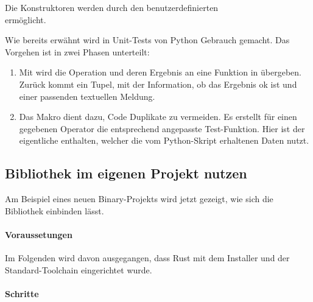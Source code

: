             Die  Konstruktoren werden durch den benutzerdefinierten \\  ermöglicht.

            Wie bereits erwähnt wird in Unit-Tests von Python Gebrauch gemacht. Das Vorgehen ist in zwei Phasen unterteilt:
            \begin{enumerate}
                \item Mit  wird die Operation und deren Ergebnis an eine Funktion in  übergeben. Zurück kommt ein Tupel, mit der Information, ob das Ergebnis ok ist und einer passenden textuellen Meldung.

                \item Das Makro  dient dazu, Code Duplikate zu vermeiden. Es erstellt für einen gegebenen Operator die entsprechend angepasste Test-Funktion. Hier ist der eigentliche  enthalten, welcher die vom Python-Skript erhaltenen Daten nutzt.
            \end{enumerate}


    \subsection{Bibliothek im eigenen Projekt nutzen} \label{sec:eigenesprojekt}
        Am Beispiel eines neuen Binary-Projekts wird jetzt gezeigt, wie sich die Bibliothek einbinden lässt.

        \paragraph*{Voraussetungen}
        Im Folgenden wird davon ausgegangen, dass Rust mit dem \href{https://rustup.rs}{} Installer und der Standard-Toolchain eingerichtet wurde.

        \paragraph*{Schritte}

